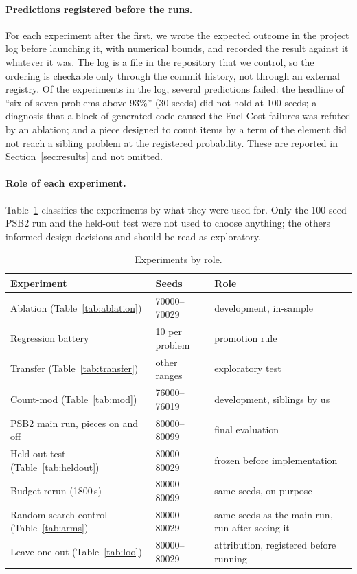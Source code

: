\documentclass[sigconf,nonacm]{acmart}
\begin{document}
\paragraph{Predictions registered before the runs.}
For each experiment after the first, we wrote the expected outcome in the project log before launching it, with numerical bounds,
and recorded the result against it whatever it was. The log is a file in the repository that we control, so the ordering is checkable only through the commit history, not through an external registry. Of the experiments in the log, several predictions failed: the headline of ``six of seven
problems above 93\%'' (30 seeds) did not hold at 100 seeds; a diagnosis that a block of generated code caused the Fuel Cost failures was
refuted by an ablation; and a piece designed to count items by a term of the element did not reach a sibling problem at the registered probability.
These are reported in Section~\ref{sec:results} and not omitted.

\paragraph{Role of each experiment.}
Table~\ref{tab:roles} classifies the experiments by what they were used for. Only the 100-seed PSB2 run and the held-out test were not used to choose anything; the others informed design decisions and should be read as exploratory.

\begin{table}[t]
  \caption{Experiments by role.}
  \label{tab:roles}
  \small
  \begin{tabular}{@{}llp{2.9cm}@{}}
    \toprule
    Experiment & Seeds & Role \\
    \midrule
    Ablation (Table~\ref{tab:ablation}) & 70000--70029 & development, in-sample \\
    Regression battery & 10 per problem & promotion rule \\
    Transfer (Table~\ref{tab:transfer}) & other ranges & exploratory test \\
    Count-mod (Table~\ref{tab:mod}) & 76000--76019 & development, siblings by us \\
    PSB2 main run, pieces on and off & 80000--80099 & final evaluation \\
    Held-out test (Table~\ref{tab:heldout}) & 80000--80029 & frozen before implementation \\
    Budget rerun (1800\,s) & 80000--80099 & same seeds, on purpose \\
    Random-search control (Table~\ref{tab:arms}) & 80000--80029 & same seeds as the main run, run after seeing it \\
    Leave-one-out (Table~\ref{tab:loo}) & 80000--80029 & attribution, registered before running \\
    \bottomrule
  \end{tabular}
\end{table}
\end{document}
